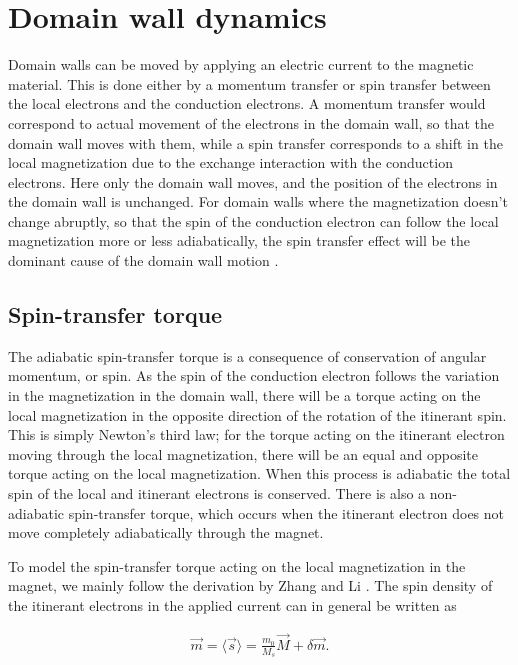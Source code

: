 \documentclass[1p]{elsarticle}		%
\numberwithin{equation}{section}
\begin{document}
\section{Domain wall dynamics}
Domain walls can be moved by applying an electric current to the magnetic material. This is done either by a momentum transfer or spin transfer between the local electrons and the conduction electrons. A momentum transfer would correspond to actual movement of the electrons in the domain wall, so that the domain wall moves with them, while a spin transfer corresponds to a shift in the local magnetization due to the exchange interaction with the conduction electrons. Here only the domain wall moves, and the position of the electrons in the domain wall is unchanged. For domain walls where the magnetization doesn't change abruptly, so that the spin of the conduction electron can follow the local magnetization more or less adiabatically, the spin transfer effect will be the dominant cause of the domain wall motion \cite{KohnoTatara-04}. 

\subsection{Spin-transfer torque}
The adiabatic spin-transfer torque is a consequence of conservation of angular momentum, or spin. As the spin of the conduction electron follows the variation in the magnetization in the domain wall, there will be a torque acting on the local magnetization in the opposite direction of the rotation of the itinerant spin. This is simply Newton's third law; for the torque acting on the itinerant electron moving through the local magnetization, there will be an equal and opposite torque acting on the local magnetization. When this process is adiabatic the total spin of the local and itinerant electrons is conserved. There is also a non-adiabatic spin-transfer torque, which occurs when the itinerant electron does not move completely adiabatically through the magnet. 

To model the spin-transfer torque acting on the local magnetization in the magnet, we mainly follow the derivation by Zhang and Li \cite{ZhangLi-04}. The spin density of the itinerant electrons in the applied current can in general be written as

\begin{align}
\label{eq:mag_current}
\vec{m} = \langle \vec{s} \rangle = \frac{m_0}{M_s}\vec{M} + \delta\vec{m}.
\end{align}
\end{document}
